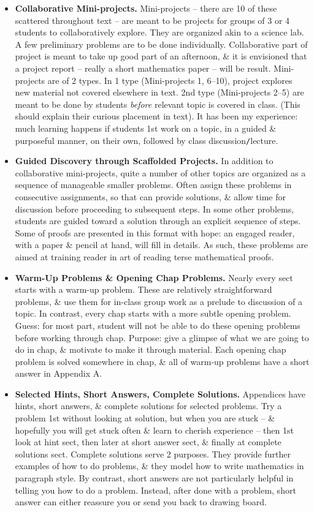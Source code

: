 \documentclass{article}
\begin{document}
\begin{itemize}
\begin{itemize}
\begin{itemize}
			\begin{itemize}
				\item {\bf Collaborative Mini-projects.} Mini-projects -- there are 10 of these scattered throughout text -- are meant to be projects for groups of 3 or 4 students to collaboratively explore. They are organized akin to a science lab. A few preliminary problems are to be done individually. Collaborative part of project is meant to take up good part of an afternoon, \& it is envisioned that a project report -- really a short mathematics paper -- will be result. Mini-projects are of 2 types. In 1 type (Mini-projects 1, 6--10), project explores new material not covered elsewhere in text. 2nd type (Mini-projects 2--5) are meant to be done by students {\it before} relevant topic is covered in class. (This should explain their curious placement in text). It has been my experience: much learning happens if students 1st work on a topic, in a guided \& purposeful manner, on their own, followed by class discussion{\tt/}lecture.
				\item {\bf Guided Discovery through Scaffolded Projects.} In addition to collaborative mini-projects, quite a number of other topics are organized as a sequence of manageable smaller problems. Often assign these problems in consecutive assignments, so that can provide solutions, \& allow time for discussion before proceeding to subsequent steps. In some other problems, students are guided toward a solution through an explicit sequence of steps. Some of proofs are presented in this format with hope: an engaged reader, with a paper \& pencil at hand, will fill in details. As such, these problems are aimed at training reader in art of reading terse mathematical proofs.
				\item {\bf Warm-Up Problems \& Opening Chap Problems.} Nearly every sect starts with a warm-up problem. These are relatively straightforward problems, \& use them for in-class group work as a prelude to discussion of a topic. In contrast, every chap starts with a more subtle opening problem. Guess: for most part, student will not be able to do these opening problems before working through chap. Purpose: give a glimpse of what we are going to do in chap, \& motivate to make it through material. Each opening chap problem is solved somewhere in chap, \& all of warm-up problems have a short answer in Appendix A.
				\item {\bf Selected Hints, Short Answers, Complete Solutions.} Appendices have hints, short answers, \& complete solutions for selected problems. Try a problem 1st without looking at solution, but when you are stuck -- \& hopefully you will get stuck often \& learn to cherish experience -- then 1st look at hint sect, then later at short answer sect, \& finally at complete solutions sect. Complete solutions serve 2 purposes. They provide further examples of how to do problems, \& they model how to write mathematics in paragraph style. By contrast, short answers are not particularly helpful in telling you how to do a problem. Instead, after done with a problem, short answer can either reassure you or send you back to drawing board.

\end{itemize}
\end{itemize}
\end{itemize}
\end{itemize}
\end{document}
